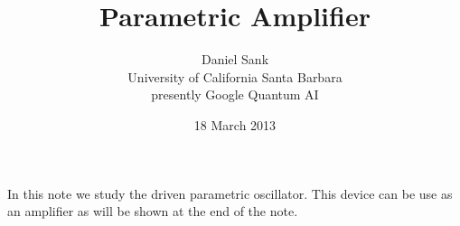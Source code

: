 \documentclass{article}
\title{Parametric Amplifier}
\author{Daniel Sank\\
\small{University of California Santa Barbara}\\
\small{presently Google Quantum AI}}
\date{18 March 2013}
\begin{document}
\maketitle

In this note we study the driven parametric oscillator.
This device can be use as an amplifier as will be shown at the end of the note.


\end{document}
